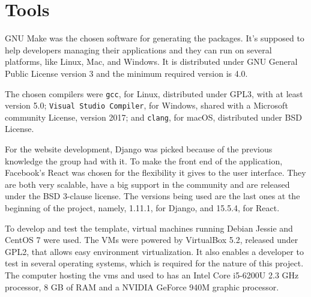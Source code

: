 \section{Tools}
\label{sec:tools}

GNU Make was the chosen software for generating the packages. It's supposed to help developers managing their applications and they can  run on several platforms, like Linux, Mac, and Windows. It is distributed under GNU General Public License version 3 and the minimum required version is 4.0.

The chosen compilers were \texttt{gcc}, for Linux, distributed under GPL3, with at least version 5.0; \texttt{Visual Studio Compiler}, for Windows, shared with a Microsoft community License, version 2017; and \texttt{clang}, for macOS, distributed under BSD License.

For the website development, Django was picked because of the previous knowledge the group had with it. To make the front end of the application, Facebook's React was chosen for the flexibility it gives to the user interface. They are both very scalable, have a big support in the community and are released under the BSD 3-clause license. The versions being used are the last ones at the beginning of the project, namely, 1.11.1, for Django, and 15.5.4, for React.


To develop and test the template, virtual machines running Debian Jessie and CentOS 7 were used. The VMs were powered by VirtualBox 5.2, released under GPL2, that allows easy environment virtualization. It also enables a developer to test in several operating systems, which is required for the nature of this project. The computer hosting the vms and used to has an Intel Core i5-6200U 2.3 GHz processor, 8 GB of RAM and a NVIDIA GeForce 940M graphic processor.

